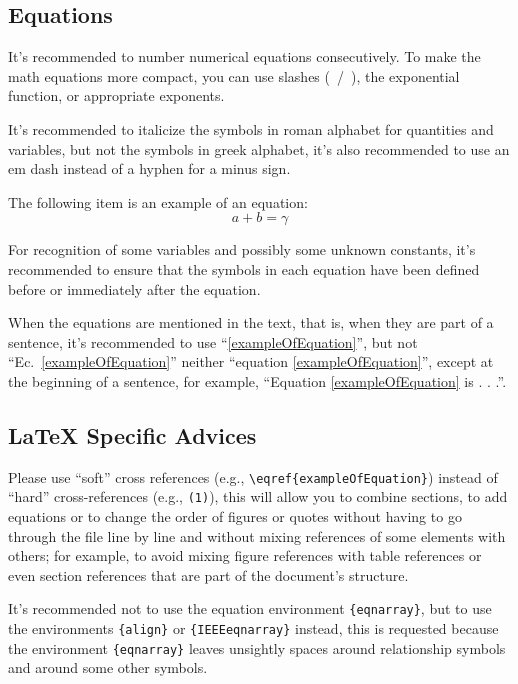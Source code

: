 \documentclass[letterpaper, 10pt, conference]{IEEEtran} %
\begin{document}
	\subsection{Equations} \label{subsectionEquations}
	It's recommended to number numerical equations consecutively. To make the math equations more compact, you can use slashes (~/~), the exponential function, or appropriate exponents.
	
	It's recommended to italicize the symbols in roman alphabet for quantities and variables, but not the symbols in greek alphabet, it's also recommended to use an em dash instead of a hyphen for a minus sign.
	
	The following item is an example of an equation:
	\begin{equation}
		a + b = \gamma
		\label{exampleOfEquation}
	\end{equation}
	
	For recognition of some variables and possibly some unknown constants, it's recommended to ensure that the symbols in each equation have been defined before or immediately after the equation.
	
	When the equations are mentioned in the text, that is, when they are part of a sentence, it's recommended to use ``\eqref{exampleOfEquation}'', but not ``Ec.~\eqref{exampleOfEquation}'' neither ``equation \eqref{exampleOfEquation}'', except at the beginning of a sentence, for example, ``Equation \eqref{exampleOfEquation} is . . .''.
	
	\subsection{{\LaTeX} Specific Advices} \label{subsectionLatexSpecificAdvices}
	Please use ``soft'' cross references (e.g., \verb|\eqref{exampleOfEquation}|) instead of ``hard'' cross-references (e.g., \verb|(1)|), this will allow you to combine sections, to add equations or to change the order of figures or quotes without having to go through the file line by line and without mixing references of some elements with others; for example, to avoid mixing figure references with table references or even section references that are part of the document's structure.
	
	It's recommended not to use the equation environment \verb|{eqnarray}|, but to use the environments \verb|{align}| or \verb|{IEEEeqnarray}| instead, this is requested because the environment \verb|{eqnarray}| leaves unsightly spaces around relationship symbols and around some other symbols.
	
\end{document}
